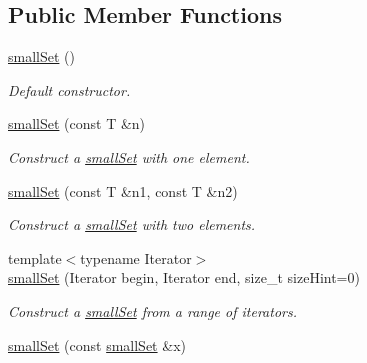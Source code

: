 \subsection*{Public Member Functions}
\begin{CompactItemize}
\item 
\hypertarget{classdai_1_1smallSet_d352a0a190ca6cf2f512757710a32fa7}{
\hyperlink{classdai_1_1smallSet_d352a0a190ca6cf2f512757710a32fa7}{smallSet} ()}
\label{classdai_1_1smallSet_d352a0a190ca6cf2f512757710a32fa7}

\begin{CompactList}\small\item\em Default constructor. \item\end{CompactList}\item 
\hypertarget{classdai_1_1smallSet_7ac59c3931af4eb31c066e599aa3e388}{
\hyperlink{classdai_1_1smallSet_7ac59c3931af4eb31c066e599aa3e388}{smallSet} (const T \&n)}
\label{classdai_1_1smallSet_7ac59c3931af4eb31c066e599aa3e388}

\begin{CompactList}\small\item\em Construct a \hyperlink{classdai_1_1smallSet}{smallSet} with one element. \item\end{CompactList}\item 
\hypertarget{classdai_1_1smallSet_727f1dd194f77e61c82658fa6b4aff93}{
\hyperlink{classdai_1_1smallSet_727f1dd194f77e61c82658fa6b4aff93}{smallSet} (const T \&n1, const T \&n2)}
\label{classdai_1_1smallSet_727f1dd194f77e61c82658fa6b4aff93}

\begin{CompactList}\small\item\em Construct a \hyperlink{classdai_1_1smallSet}{smallSet} with two elements. \item\end{CompactList}\item 
{\footnotesize template$<$typename Iterator$>$ }\\\hyperlink{classdai_1_1smallSet_54b3816da5edcd6bc664172ef05305a7}{smallSet} (Iterator begin, Iterator end, size\_\-t sizeHint=0)
\begin{CompactList}\small\item\em Construct a \hyperlink{classdai_1_1smallSet}{smallSet} from a range of iterators. \item\end{CompactList}\item 
\hypertarget{classdai_1_1smallSet_5d97d7862890177b0830168f147255ac}{
\hyperlink{classdai_1_1smallSet_5d97d7862890177b0830168f147255ac}{smallSet} (const \hyperlink{classdai_1_1smallSet}{smallSet} \&x)}
\label{classdai_1_1smallSet_5d97d7862890177b0830168f147255ac}


\end{CompactItemize}

